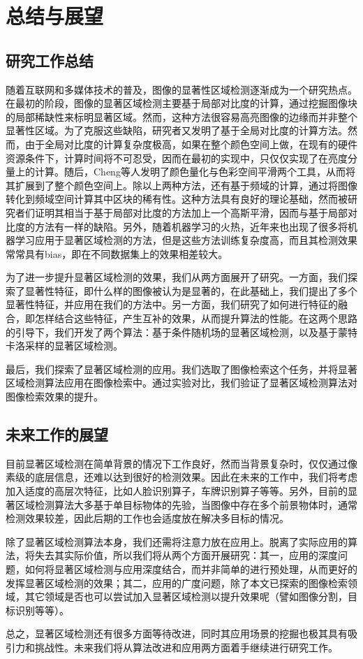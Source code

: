 \chapter{总结与展望}
\section{研究工作总结}
随着互联网和多媒体技术的普及，图像的显著性区域检测逐渐成为一个研究热点。在最初的阶段，图像的显著区域检测主要基于局部对比度的计算，通过挖掘图像块的局部稀缺性来标明显著区域。然而，这种方法很容易高亮图像的边缘而并非整个显著性区域。为了克服这些缺陷，研究者又发明了基于全局对比度的计算方法。然而，由于全局对比度的计算复杂度极高，如果在整个颜色空间上做，在现有的硬件资源条件下，计算时间将不可忍受，因而在最初的实现中，只仅仅实现了在亮度分量上的计算。随后，Cheng等人\cite{cheng2011global}发明了颜色量化与色彩空间平滑两个工具，从而将其扩展到了整个颜色空间上。除以上两种方法，还有基于频域的计算，通过将图像转化到频域空间计算其中区块的稀有性。这种方法具有良好的理论基础，然而被研究者们证明其相当于基于局部对比度的方法加上一个高斯平滑，因而与基于局部对比度的方法有一样的缺陷。另外，随着机器学习的火热，近年来也出现了很多将机器学习应用于显著区域检测的方法，但是这些方法训练复杂度高，而且其检测效果常常具有bias，即在不同数据集上的效果相差较大。

为了进一步提升显著区域检测的效果，我们从两方面展开了研究。一方面，我们探索了显著性特征，即什么样的图像被认为是显著的，在此基础上，我们提出了多个显著性特征，并应用在我们的方法中。另一方面，我们研究了如何进行特征的融合，即怎样结合这些特征，产生互补的效果，从而提升算法的性能。在这两个思路的引导下，我们开发了两个算法：基于条件随机场的显著区域检测，以及基于蒙特卡洛采样的显著区域检测。

最后，我们探索了显著区域检测的应用。我们选取了图像检索这个任务，并将显著区域检测算法应用在图像检索中。通过实验对比，我们验证了显著区域检测算法对图像检索效果的提升。

\section{未来工作的展望}
目前显著区域检测在简单背景的情况下工作良好，然而当背景复杂时，仅仅通过像素级的底层信息，还难以达到很好的检测效果。因此在未来的工作中，我们将考虑加入适度的高层次特征，比如人脸识别算子，车牌识别算子等等。另外，目前的显著区域检测算法大多基于单目标物体的先验，当图像中存在多个前景物体时，通常检测效果较差，因此后期的工作也会适度放在解决多目标的情况。

除了显著区域检测算法本身，我们还需将注意力放在应用上。脱离了实际应用的算法，将失去其实际价值，所以我们将从两个方面开展研究：其一，应用的深度问题，如何将显著区域检测与应用深度结合，而并非简单的进行预处理，从而更好的发挥显著区域检测的效果；其二，应用的广度问题，除了本文已探索的图像检索领域，其它领域是否也可以尝试加入显著区域检测以提升效果呢（譬如图像分割，目标识别等等）。

总之，显著区域检测还有很多方面等待改进，同时其应用场景的挖掘也极其具有吸引力和挑战性。未来我们将从算法改进和应用两方面着手继续进行研究工作。
